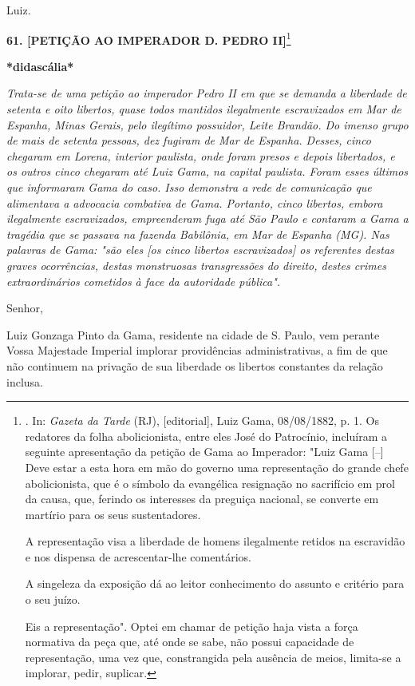 Luiz.

\textbf{61. {[}PETIÇÃO AO IMPERADOR D. PEDRO II{]}}\footnote{. In:
  \emph{Gazeta da Tarde} (RJ), {[}editorial{]}, Luiz Gama, 08/08/1882,
  p. 1. Os redatores da folha abolicionista, entre eles José do
  Patrocínio, incluíram a seguinte apresentação da petição de Gama ao
  Imperador: "Luiz Gama {[}--{]} Deve estar a esta hora em mão do
  governo uma representação do grande chefe abolicionista, que é o
  símbolo da evangélica resignação no sacrifício em prol da causa, que,
  ferindo os interesses da preguiça nacional, se converte em martírio
  para os seus sustentadores.

  A representação visa a liberdade de homens ilegalmente retidos na
  escravidão e nos dispensa de acrescentar-lhe comentários.

  A singeleza da exposição dá ao leitor conhecimento do assunto e
  critério para o seu juízo.

  Eis a representação". Optei em chamar de petição haja vista a força
  normativa da peça que, até onde se sabe, não possui capacidade de
  representação, uma vez que, constrangida pela ausência de meios,
  limita-se a implorar, pedir, suplicar.}

\textbf{*didascália*}

\emph{Trata-se de uma petição ao imperador Pedro II em que se demanda a
liberdade de setenta e oito libertos, quase todos mantidos ilegalmente
escravizados em Mar de Espanha, Minas Gerais, pelo ilegítimo possuidor,
Leite Brandão. Do imenso grupo de mais de setenta pessoas, dez fugiram
de Mar de Espanha. Desses, cinco chegaram em Lorena, interior paulista,
onde foram presos e depois libertados, e os outros cinco chegaram até
Luiz Gama, na capital paulista. Foram esses últimos que informaram Gama
do caso. Isso demonstra a rede de comunicação que alimentava a advocacia
combativa de Gama. Portanto, cinco libertos, embora ilegalmente
escravizados, empreenderam fuga até São Paulo e contaram a Gama a
tragédia que se passava na fazenda Babilônia, em Mar de Espanha (MG).
Nas palavras de Gama: "são eles {[}os cinco libertos escravizados{]} os
referentes destas graves ocorrências, destas monstruosas transgressões
do direito, destes crimes extraordinários cometidos à face da autoridade
pública". }

Senhor,

Luiz Gonzaga Pinto da Gama, residente na cidade de S. Paulo, vem perante
Vossa Majestade Imperial implorar providências administrativas, a fim de
que não continuem na privação de sua liberdade os libertos constantes da
relação inclusa.

